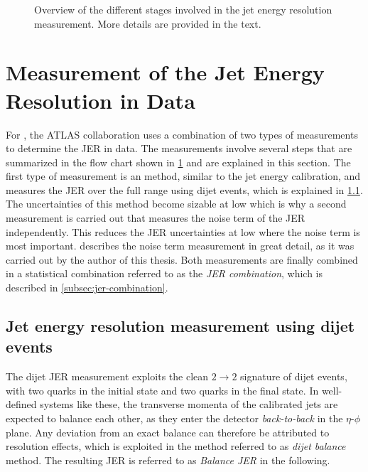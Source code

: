 \FloatBarrier
\begin{figure}[t]
    \caption[Overview of the different stages involved in the JER measurement.]{Overview of the different stages involved in the jet energy resolution measurement. More details are provided in the text.}
    \label{fig:flow-chart-jer}
\end{figure}


\section{Measurement of the Jet Energy Resolution in Data}
\label{sec:jer-measurement}
For \RunTwo, the ATLAS collaboration uses a combination of two types of measurements to determine the JER in data. The measurements involve several steps that are summarized in the flow chart shown in \cref{fig:flow-chart-jer} and are explained in this section.
The first type of measurement is an \insitu method, similar to the \insitu jet energy calibration, and measures the JER over the full \pT range using dijet events, which is explained in \cref{subsec:dijet-balance}. The uncertainties of this method become sizable at low \pT which is why a second measurement is carried out that measures the noise term of the JER independently. This reduces the JER uncertainties at low \pT where the noise term is most important.  describes the noise term measurement in great detail, as it was carried out by the author of this thesis.
Both measurements are finally combined in a statistical combination referred to as the \emph{JER combination}, which is described in \cref{subsec:jer-combination}.

\subsection{Jet energy resolution measurement using dijet events}
\label{subsec:dijet-balance}
The dijet \insitu JER measurement exploits the clean $2 \rightarrow 2$ signature of dijet events, with two quarks in the initial state and two quarks in the final state. In well-defined systems like these, the transverse momenta of the calibrated jets are expected to balance each other, as they enter the detector \emph{back-to-back} in the $\eta$-$\phi$ plane. Any deviation from an exact balance can therefore be attributed to resolution effects, which is exploited in the method referred to as \emph{dijet balance} method. The resulting JER is referred to as \emph{Balance JER} in the following.

